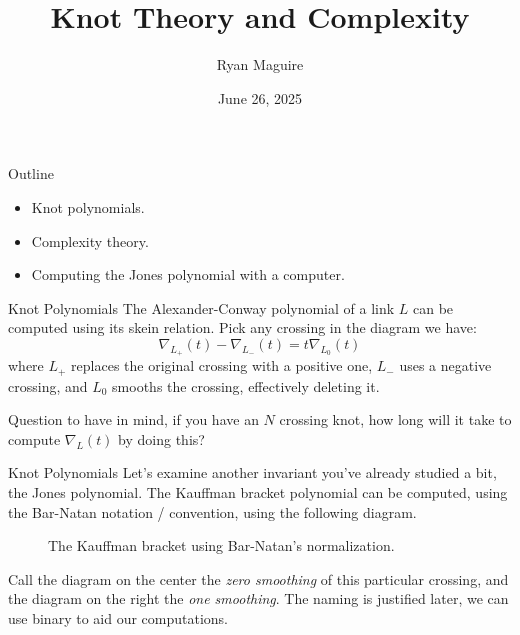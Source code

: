 \documentclass{beamer}
\title{Knot Theory and Complexity}
\author{Ryan Maguire}
\date{June 26, 2025}
\begin{document}
    \maketitle
    \begin{frame}{Outline}
        \begin{itemize}
            \item Knot polynomials.
            \item Complexity theory.
            \item Computing the Jones polynomial with a computer.
        \end{itemize}
    \end{frame}
    \begin{frame}{Knot Polynomials}
        The Alexander-Conway polynomial of a link $L$ can be computed using its
        skein relation. Pick any crossing in the diagram we have:
        \begin{equation}
            \nabla_{L_{+}}(t)-\nabla_{L_{-}}(t)=t\nabla_{L_{0}}(t)
        \end{equation}
        where $L_{+}$ replaces the original crossing with a positive one,
        $L_{-}$ uses a negative crossing, and $L_{0}$ smooths the crossing,
        effectively deleting it.
        \par\hfill\par
        Question to have in mind, if you have an $N$ crossing knot, how long
        will it take to compute $\nabla_{L}(t)$ by doing this?
    \end{frame}
    \begin{frame}{Knot Polynomials}
        Let's examine another invariant you've already studied a bit, the
        Jones polynomial. The Kauffman bracket polynomial can be computed,
        using the Bar-Natan notation / convention, using the following
        diagram.
        \begin{figure}
            \centering
            \caption{The Kauffman bracket using Bar-Natan's normalization.}
        \end{figure}
        Call the diagram on the center the \textit{zero smoothing} of this
        particular crossing, and the diagram on the right the
        \textit{one smoothing}. The naming is justified later, we can use
        binary to aid our computations.
    \end{frame}
\end{document}
